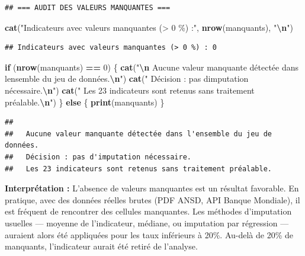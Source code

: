 \documentclass[
]{article}
\newenvironment{Shaded}{\begin{snugshade}}{\end{snugshade}}
\newcommand{\ControlFlowTok}[1]{\textcolor[rgb]{0.13,0.29,0.53}{\textbf{#1}}}
\newcommand{\DecValTok}[1]{\textcolor[rgb]{0.00,0.00,0.81}{#1}}
\newcommand{\FunctionTok}[1]{\textcolor[rgb]{0.13,0.29,0.53}{\textbf{#1}}}
\newcommand{\NormalTok}[1]{#1}
\newcommand{\SpecialCharTok}[1]{\textcolor[rgb]{0.81,0.36,0.00}{\textbf{#1}}}
\newcommand{\StringTok}[1]{\textcolor[rgb]{0.31,0.60,0.02}{#1}}
\begin{document}
\begin{verbatim}
## === AUDIT DES VALEURS MANQUANTES ===
\end{verbatim}

\begin{Shaded}
\begin{Highlighting}[]
\FunctionTok{cat}\NormalTok{(}\StringTok{"Indicateurs avec valeurs manquantes (\textgreater{} 0 \%) :"}\NormalTok{, }\FunctionTok{nrow}\NormalTok{(manquants), }\StringTok{"}\SpecialCharTok{\textbackslash{}n}\StringTok{"}\NormalTok{)}
\end{Highlighting}
\end{Shaded}

\begin{verbatim}
## Indicateurs avec valeurs manquantes (> 0 %) : 0
\end{verbatim}

\begin{Shaded}
\begin{Highlighting}[]
\ControlFlowTok{if}\NormalTok{ (}\FunctionTok{nrow}\NormalTok{(manquants) }\SpecialCharTok{==} \DecValTok{0}\NormalTok{) \{}
  \FunctionTok{cat}\NormalTok{(}\StringTok{"}\SpecialCharTok{\textbackslash{}n}\StringTok{  Aucune valeur manquante détectée dans l\textquotesingle{}ensemble du jeu de données.}\SpecialCharTok{\textbackslash{}n}\StringTok{"}\NormalTok{)}
  \FunctionTok{cat}\NormalTok{(}\StringTok{"  Décision : pas d\textquotesingle{}imputation nécessaire.}\SpecialCharTok{\textbackslash{}n}\StringTok{"}\NormalTok{)}
  \FunctionTok{cat}\NormalTok{(}\StringTok{"  Les 23 indicateurs sont retenus sans traitement préalable.}\SpecialCharTok{\textbackslash{}n}\StringTok{"}\NormalTok{)}
\NormalTok{\} }\ControlFlowTok{else}\NormalTok{ \{}
  \FunctionTok{print}\NormalTok{(manquants)}
\NormalTok{\}}
\end{Highlighting}
\end{Shaded}

\begin{verbatim}
## 
##   Aucune valeur manquante détectée dans l'ensemble du jeu de données.
##   Décision : pas d'imputation nécessaire.
##   Les 23 indicateurs sont retenus sans traitement préalable.
\end{verbatim}

\textbf{Interprétation :} L'absence de valeurs manquantes est un
résultat favorable. En pratique, avec des données réelles brutes (PDF
ANSD, API Banque Mondiale), il est fréquent de rencontrer des cellules
manquantes. Les méthodes d'imputation usuelles --- moyenne de
l'indicateur, médiane, ou imputation par régression --- auraient alors
été appliquées pour les taux inférieurs à 20\%. Au-delà de 20\% de
manquants, l'indicateur aurait été retiré de l'analyse.
\end{document}
